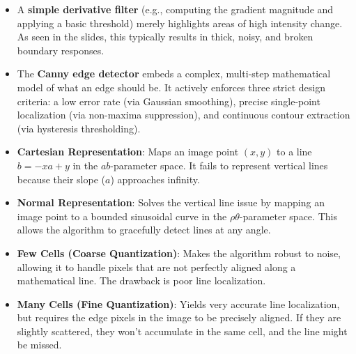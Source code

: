 {\begin{itemize}
    \item A \textbf{simple derivative filter} (e.g., computing the gradient magnitude and applying a basic threshold) merely highlights areas of high intensity change. As seen in the slides, this typically results in thick, noisy, and broken boundary responses.
    \item The \textbf{Canny edge detector} embeds a complex, multi-step mathematical model of what an edge should be. It actively enforces three strict design criteria: a low error rate (via Gaussian smoothing), precise single-point localization (via non-maxima suppression), and continuous contour extraction (via hysteresis thresholding).
\end{itemize}}

{\begin{itemize}
    \item \textbf{Cartesian Representation}: Maps an image point $(x, y)$ to a line $b = -xa + y$ in the $ab$-parameter space. It fails to represent vertical lines because their slope ($a$) approaches infinity.
    \item \textbf{Normal Representation}: Solves the vertical line issue by mapping an image point to a bounded sinusoidal curve in the $\rho\theta$-parameter space. This allows the algorithm to gracefully detect lines at any angle.
\end{itemize}}

{\begin{itemize}
    \item \textbf{Few Cells (Coarse Quantization)}: Makes the algorithm robust to noise, allowing it to handle pixels that are not perfectly aligned along a mathematical line. The drawback is poor line localization.
    \item \textbf{Many Cells (Fine Quantization)}: Yields very accurate line localization, but requires the edge pixels in the image to be precisely aligned. If they are slightly scattered, they won't accumulate in the same cell, and the line might be missed.
\end{itemize}}

